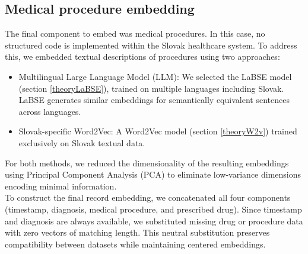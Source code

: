 \subsection{Medical procedure embedding}
\label{procedureEmb}

The final component to embed was medical procedures. In this case, no structured code is implemented within the Slovak healthcare system. To address this, we embedded textual descriptions of procedures using two approaches:

\begin{itemize}
	\item Multilingual Large Language Model (LLM): We selected the LaBSE model (section \ref{theoryLaBSE}), trained on multiple languages including Slovak. LaBSE generates similar embeddings for semantically equivalent sentences across languages.
	\item Slovak-specific Word2Vec: A Word2Vec model (section \ref{theoryW2v}) trained exclusively on Slovak textual data.
\end{itemize}

For both methods, we reduced the dimensionality of the resulting embeddings using Principal Component Analysis (PCA) to eliminate low-variance dimensions encoding minimal information.
\\

To construct the final record embedding, we concatenated all four components (timestamp, diagnosis, medical procedure, and prescribed drug). Since timestamp and diagnosis are always available, we substituted missing drug or procedure data with zero vectors of matching length. This neutral substitution preserves compatibility between datasets while maintaining centered embeddings.